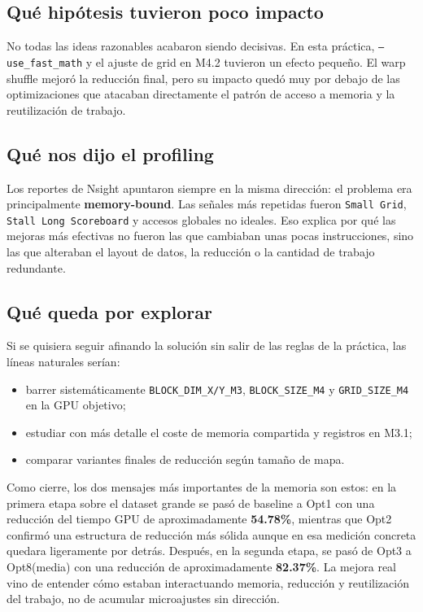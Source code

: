 \documentclass[11pt,a4paper]{article}
\begin{document}
\subsection{Qué hipótesis tuvieron poco impacto}

No todas las ideas razonables acabaron siendo decisivas. En esta práctica, \texttt{--use\_fast\_math} y el ajuste de grid en M4.2 tuvieron un efecto pequeño. El warp shuffle mejoró la reducción final, pero su impacto quedó muy por debajo de las optimizaciones que atacaban directamente el patrón de acceso a memoria y la reutilización de trabajo.

\subsection{Qué nos dijo el profiling}

Los reportes de Nsight apuntaron siempre en la misma dirección: el problema era principalmente \textbf{memory-bound}. Las señales más repetidas fueron \texttt{Small Grid}, \texttt{Stall Long Scoreboard} y accesos globales no ideales. Eso explica por qué las mejoras más efectivas no fueron las que cambiaban unas pocas instrucciones, sino las que alteraban el layout de datos, la reducción o la cantidad de trabajo redundante.

\subsection{Qué queda por explorar}

Si se quisiera seguir afinando la solución sin salir de las reglas de la práctica, las líneas naturales serían:
\begin{itemize}
  \item barrer sistemáticamente \texttt{BLOCK\_DIM\_X/Y\_M3}, \texttt{BLOCK\_SIZE\_M4} y \texttt{GRID\_SIZE\_M4} en la GPU objetivo;
  \item estudiar con más detalle el coste de memoria compartida y registros en M3.1;
  \item comparar variantes finales de reducción según tamaño de mapa.
\end{itemize}

Como cierre, los dos mensajes más importantes de la memoria son estos: en la primera etapa sobre el dataset grande se pasó de baseline a Opt1 con una reducción del tiempo GPU de aproximadamente \textbf{54.78\%}, mientras que Opt2 confirmó una estructura de reducción más sólida aunque en esa medición concreta quedara ligeramente por detrás. Después, en la segunda etapa, se pasó de Opt3 a Opt8(media) con una reducción de aproximadamente \textbf{82.37\%}. La mejora real vino de entender cómo estaban interactuando memoria, reducción y reutilización del trabajo, no de acumular microajustes sin dirección.
\end{document}
